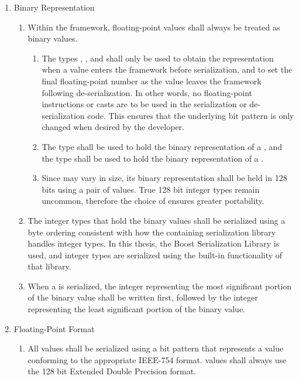 \begin{enumerate}
  \item Binary Representation
  \begin{enumerate}
    \item Within the framework, floating-point values shall always be treated as binary values. 
    \begin{enumerate}
      \item The types , , and  shall only be used to obtain the representation when a value enters the framework before serialization, and to set the final floating-point number as the value leaves the framework following de-serialization. In other words, no floating-point instructions or casts are to be used in the serialization or de-serialization code. This ensures that the underlying bit pattern is only changed when desired by the developer.
      
      \item The type  shall be used to hold the binary representation of a , and the type  shall be used to hold the binary representation of a .
      
      \item Since  may vary in size, its binary representation shall be held in 128 bits using a pair of  values. True 128 bit integer types remain uncommon, therefore the choice of  ensures greater portability.
    \end{enumerate}
    
    \item The integer types that hold the binary values shall be serialized using a byte ordering consistent with how the containing serialization library handles integer types. In this thesis, the Boost Serialization Library is used, and integer types are serialized using the built-in functionality of that library.
    
    \item When a  is serialized, the integer representing the most significant portion of the binary value shall be written first, followed by the integer representing the least significant portion of the binary value.
  \end{enumerate}
  
  \item Floating-Point Format
  \begin{enumerate}
    \item All values shall be serialized using a bit pattern that represents a value conforming to the appropriate IEEE-754 format.  values shall always use the 128 bit Extended Double Precision format.
    

\end{enumerate}
\end{enumerate}
